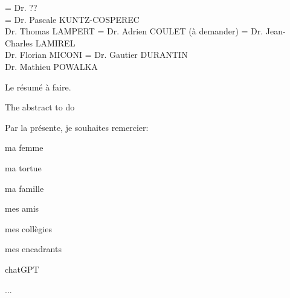 \documentclass[11pt]{template/thesul}
\begin{document}


\ThesisUL

\President={
    Dr. ??\\
}
\Rapporteurs ={
    Dr. Pascale KUNTZ-COSPEREC\\
    Dr. Thomas LAMPERT
}
\Examinateurs={
    Dr. Adrien COULET (à demander)
}
\Encadrants={
    Dr. Jean-Charles LAMIREL\\
    Dr. Florian MICONI
}
\Invites={
    Dr. Gautier DURANTIN\\
    Dr. Mathieu POWALKA
}

\MakeThesisTitlePage



\NumberAbstractPages
\begin{ThesisAbstract}

    \begin{FrenchAbstract}
        Le résumé à faire.
    \end{FrenchAbstract}

    \begin{EnglishAbstract}
        The abstract to do
    \end{EnglishAbstract}
\end{ThesisAbstract}


\begin{ThesisAcknowledgments}

    Par la présente, je souhaites remercier:
    \begin{todolist}
        \item ma femme
        \item ma tortue
        \item ma famille
        \item mes amis
        \item mes collègies
        \item mes encadrants
        \item chatGPT
        \item ...
    \end{todolist}

\end{ThesisAcknowledgments}
\end{document}
